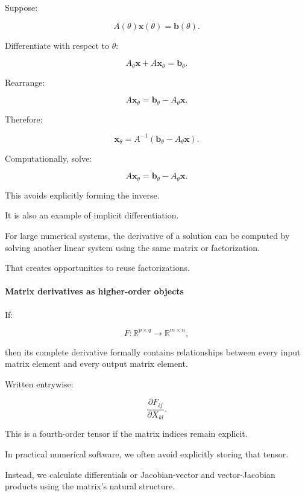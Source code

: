 \hypertarget{02-foundations-ii-ch027-differentiating-a-linear-solve}{}

Suppose:

\[
A(\theta)\mathbf x(\theta)=\mathbf b(\theta).
\]

Differentiate with respect to \(\theta\):

\[
A_\theta\mathbf x+A\mathbf x_\theta = \mathbf b_\theta.
\]

Rearrange:

\[
A\mathbf x_\theta= \mathbf b_\theta-A_\theta\mathbf x.
\]

Therefore:

\[
\boxed{ \mathbf x_\theta = A^{-1}(\mathbf b_\theta-A_\theta\mathbf x) }.
\]

Computationally, solve:

\[
\boxed{ A\mathbf x_\theta = \mathbf b_\theta-A_\theta\mathbf x }.
\]

This avoids explicitly forming the inverse.

It is also an example of implicit differentiation.

For large numerical systems, the derivative of a solution can be computed by solving another linear system using the same matrix or factorization.

That creates opportunities to reuse factorizations.

\paragraph{Matrix derivatives as higher-order objects}\label{02-foundations-ii-ch027-matrix-derivatives-as-higher-order-objects}

\hypertarget{02-foundations-ii-ch027-matrix-derivatives-as-higher-order-objects}{}

If:

\[
F:\mathbb R^{p\times q}\rightarrow\mathbb R^{m\times n},
\]

then its complete derivative formally contains relationships between every input matrix element and every output matrix element.

Written entrywise:

\[
\frac{\partial F_{ij}}{\partial X_{kl}}.
\]

This is a fourth-order tensor if the matrix indices remain explicit.

In practical numerical software, we often avoid explicitly storing that tensor.

Instead, we calculate differentials or Jacobian-vector and vector-Jacobian products using the matrix's natural structure.

